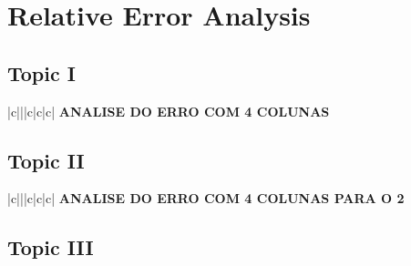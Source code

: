 \section{Relative Error Analysis}
\label{sec:erroranalysis}

\subsection{Topic I}
\label{subsec:first_topic_error}

\begin{center}
   \begin{tabular}{|c|||c|c|c|}
      \hline    
       {\bf ANALISE DO ERRO COM 4 COLUNAS} \\
      \hline
        
   \end{tabular}
 \end{center}
 
 
 
\subsection{Topic II}
\label{subsec:second_topic_error}

\begin{center}
   \begin{tabular}{|c|||c|c|c|}
      \hline    
       {\bf ANALISE DO ERRO COM 4 COLUNAS PARA O 2} \\
      \hline
        
   \end{tabular}
 \end{center}
 
 
\subsection{Topic III}
\label{subsec:third_topic_error}

